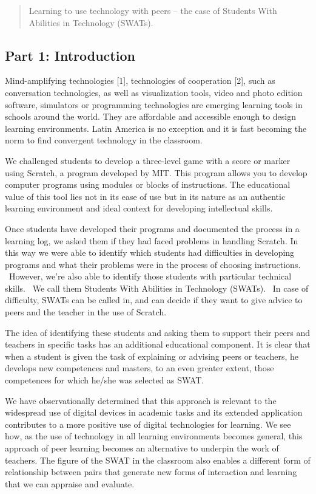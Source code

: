 \begin{quote}
Learning to use technology with peers -- the case of Students With
Abilities in Technology (SWATs).
\end{quote}

\subsection{Part 1: Introduction}\label{part-1-introduction}

Mind-amplifying technologies {{[}1{]}}, technologies of cooperation
{{[}2{]}}, such as conversation technologies, as well as visualization
tools, video and photo edition software, simulators or programming
technologies are emerging learning tools in schools around the world.
They are affordable and accessible enough to design learning
environments. Latin America is no exception and it is fast becoming the
norm to find convergent technology in the classroom.

We challenged students to develop a three-level game with a score or
marker using Scratch, a program developed by MIT. This program allows
you to develop computer programs using modules or blocks of
instructions. The educational value of this tool lies not in its ease of
use but in its nature as an authentic learning environment and ideal
context for developing intellectual skills.

Once students have developed their programs and documented the process
in a learning log, we asked them if they had faced problems in handling
Scratch. In this way we were able to identify which students had
difficulties in developing programs and what their problems were in the
process of choosing instructions. ~However, we're also able to identify
those students with particular technical skills. ~We call them Students
With Abilities in Technology (SWATs). ~In case of difficulty, SWATs can
be called in, and can decide if they want to give advice to peers and
the teacher in the use of Scratch.

The idea of identifying these students and asking them to support their
peers and teachers in specific tasks has an additional educational
component. It is clear that when a student is given the task of
explaining or advising peers or teachers, he develops new competences
and masters, to an even greater extent, those competences for which
he/she was selected as SWAT.

We have observationally determined that this approach is relevant to the
widespread use of digital devices in academic tasks and its extended
application contributes to a more positive use of digital technologies
for learning. We see how, as the use of technology in all learning
environments becomes general, this approach of peer learning becomes an
alternative to underpin the work of teachers. The figure of the SWAT in
the classroom also enables a different form of relationship between
pairs that generate new forms of interaction and learning that we can
appraise and evaluate.

